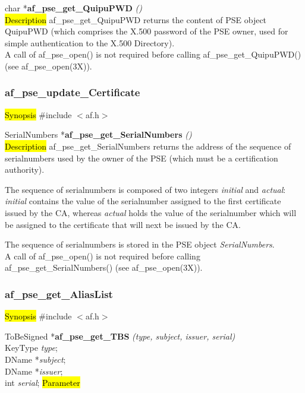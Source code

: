 char *{\bf af\_pse\_get\_QuipuPWD} {\em ()} \\
\hl{Description}
af\_pse\_get\_QuipuPWD returns the content of PSE object QuipuPWD (which
comprises the X.500 password of the PSE owner, used for simple authentication to the
X.500 Directory).
\\ [1em]
A call of af\_pse\_open() is not required before calling af\_pse\_get\_QuipuPWD()
(see af\_pse\_open(3X)).


\subsubsection{af\_pse\_update\_Certificate}
\label{af_get_SerialNumbers}
\hl{Synopsis}
\#include $<$af.h$>$

SerialNumbers *{\bf af\_pse\_get\_SerialNumbers} {\em ()} \\
\hl{Description}
af\_pse\_get\_SerialNumbers returns the address of the sequence of serialnumbers
used by the owner of the PSE (which must be a certification authority).

The sequence of serialnumbers is composed of two integers {\em initial} and {\em actual}:
{\em initial} contains the value of the serialnumber assigned to the first
certificate issued by the CA, whereas {\em actual}
holds the value of the serialnumber which will be assigned to the certificate that will next be issued
by the CA.

The sequence of serialnumbers is stored in the PSE object {\em SerialNumbers}.
\\ [1em]
A call of af\_pse\_open() is not required before calling af\_pse\_get\_SerialNumbers()
(see af\_pse\_open(3X)).


\subsubsection{af\_pse\_get\_AliasList}
\label{af_search_tbs_Name}
\hl{Synopsis}
\#include $<$af.h$>$

ToBeSigned *{\bf af\_pse\_get\_TBS} {\em (type, subject, issuer, serial)} \\
KeyType {\em type}; \\
DName *{\em subject}; \\
DName *{\em issuer}; \\
int {\em serial};
\hl{Parameter}

